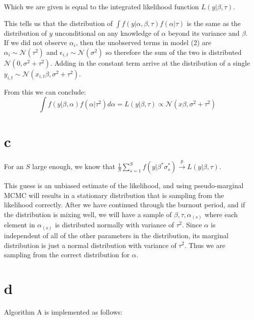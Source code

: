 \documentclass[12pt]{paper}
\newcommand{\plim}{ \overset{p}{\to} }
\newcommand{\normal}{\mathcal{N}}
\begin{document}
Which we are given is equal to the integrated likelihood function
$L(y \vert \beta, \tau)$.


This tells us that the distribution of $\int f( y \vert \alpha, \beta, \tau) f( \alpha \vert \tau)$
is the same as the distribution of $y$ unconditional on any knowledge
of $\alpha$ beyond its variance and $\beta$. If we did not observe $\alpha_i$, then the
unobserved terms in model (2) are $\alpha_i \sim \normal( \tau^2)$ and $\epsilon_{i,t} \sim
\normal( \sigma^2 )$ so therefore the sum of the two is distributed
$\normal( 0, \sigma^2 + \tau^2)$. Adding in the constant term arrive at the
distribution of a single $y_{i,t} \sim \normal( x_{i,t}\beta, \sigma^2 +
\tau^2)$.

From this we can conclude:
\begin{equation*}
  \int f(y \vert \beta,\alpha) f(\alpha \vert \tau^2)d\alpha = L( y \vert \beta, \tau) \propto \normal(x\beta, \sigma^2 + \tau^2)
\end{equation*}


\section{c}
For an $S$ large enough, we know that $\frac{1}{S}\sum_{s=1}^S f( y \vert
\beta^{*} \sigma_s^{*}) \plim L(y \vert \beta, \tau)$.

This guess is an unbiased estimate of the likelihood, and using
pseudo-marginal MCMC will results in a stationary distribution that is
sampling from the likelihood correctly. After we have continued
through the burnout period, and if the distribution is mixing well, we
will have a sample of $\beta,\tau,\alpha_{(s)}$ where each element in
$\alpha_{(s)}$ is distributed normally with variance of $\tau^2$. Since
$\alpha$ is independent of all of the other parameters in the distribution,
its marginal distribution is just a normal distribution with variance
of $\tau^2$. Thus we are sampling from the correct distribution for $\alpha$.


\section{d}

Algorithm A is implemented as follows:
\end{document}
